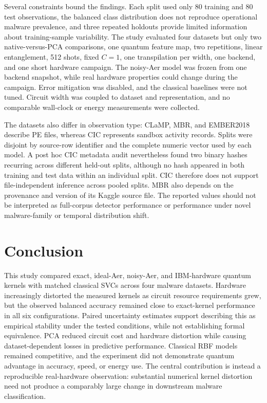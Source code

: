\documentclass[letterpaper]{article} %
\begin{document}
Several constraints bound the findings. Each split used only 80 training and 80 test observations, the balanced class distribution does not reproduce operational malware prevalence, and three repeated holdouts provide limited information about training-sample variability. The study evaluated four datasets but only two native-versus-PCA comparisons, one quantum feature map, two repetitions, linear entanglement, 512 shots, fixed $C=1$, one transpilation per width, one backend, and one short hardware campaign. The noisy-Aer model was frozen from one backend snapshot, while real hardware properties could change during the campaign. Error mitigation was disabled, and the classical baselines were not tuned. Circuit width was coupled to dataset and representation, and no comparable wall-clock or energy measurements were collected.

The datasets also differ in observation type: CLaMP, MBR, and EMBER2018 describe PE files, whereas CIC represents sandbox activity records. Splits were disjoint by source-row identifier and the complete numeric vector used by each model. A post hoc CIC metadata audit nevertheless found two binary hashes recurring across different held-out splits, although no hash appeared in both training and test data within an individual split. CIC therefore does not support file-independent inference across pooled splits. MBR also depends on the provenance and version of its Kaggle source file. The reported values should not be interpreted as full-corpus detector performance or performance under novel malware-family or temporal distribution shift.

\section{Conclusion}

This study compared exact, ideal-Aer, noisy-Aer, and IBM-hardware quantum kernels with matched classical SVCs across four malware datasets. Hardware increasingly distorted the measured kernels as circuit resource requirements grew, but the observed balanced accuracy remained close to exact-kernel performance in all six configurations. Paired uncertainty estimates support describing this as empirical stability under the tested conditions, while not establishing formal equivalence. PCA reduced circuit cost and hardware distortion while causing dataset-dependent losses in predictive performance. Classical RBF models remained competitive, and the experiment did not demonstrate quantum advantage in accuracy, speed, or energy use. The central contribution is instead a reproducible real-hardware observation: substantial numerical kernel distortion need not produce a comparably large change in downstream malware classification.
\end{document}
